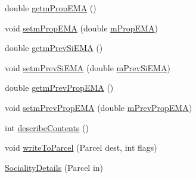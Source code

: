 \begin{DoxyCompactItemize}
\item 
double \hyperlink{classcs_1_1nsense_1_1inference_module_1_1_sociality_details_af29830e8f42f5ba0c631082119571523}{getm\-Prop\-E\-M\-A} ()
\item 
void \hyperlink{classcs_1_1nsense_1_1inference_module_1_1_sociality_details_a1f9ebb72d02553ad59f3a68ba65e1ebb}{setm\-Prop\-E\-M\-A} (double \hyperlink{classcs_1_1nsense_1_1inference_module_1_1_sociality_details_ad774c9e34300d93e24f485e907e92b9e}{m\-Prop\-E\-M\-A})
\item 
double \hyperlink{classcs_1_1nsense_1_1inference_module_1_1_sociality_details_a8b78d906aec282565fead5a719865455}{getm\-Prev\-Si\-E\-M\-A} ()
\item 
void \hyperlink{classcs_1_1nsense_1_1inference_module_1_1_sociality_details_a89091b2f4a8d3d7f04ecc323812dc056}{setm\-Prev\-Si\-E\-M\-A} (double \hyperlink{classcs_1_1nsense_1_1inference_module_1_1_sociality_details_acf0f989a385f0f400e31a4e26caa7bec}{m\-Prev\-Si\-E\-M\-A})
\item 
double \hyperlink{classcs_1_1nsense_1_1inference_module_1_1_sociality_details_a6410abbf14d8e48666b3fcfff5d82cca}{getm\-Prev\-Prop\-E\-M\-A} ()
\item 
void \hyperlink{classcs_1_1nsense_1_1inference_module_1_1_sociality_details_a8958059d7b24058baa5590586ad1af92}{setm\-Prev\-Prop\-E\-M\-A} (double \hyperlink{classcs_1_1nsense_1_1inference_module_1_1_sociality_details_a681b079820f25dddabda62d25e1f8cfe}{m\-Prev\-Prop\-E\-M\-A})
\item 
int \hyperlink{classcs_1_1nsense_1_1inference_module_1_1_sociality_details_aea7c030d8cd5c0afeeb6c9821157b3ab}{describe\-Contents} ()
\item 
void \hyperlink{classcs_1_1nsense_1_1inference_module_1_1_sociality_details_a51329c27de5fe1ed7f48797fcd9fb378}{write\-To\-Parcel} (Parcel dest, int flags)
\item 
\hyperlink{classcs_1_1nsense_1_1inference_module_1_1_sociality_details_a4d9a51c5616fe28b857d12bbb386fc2a}{Sociality\-Details} (Parcel in)
\end{DoxyCompactItemize}
